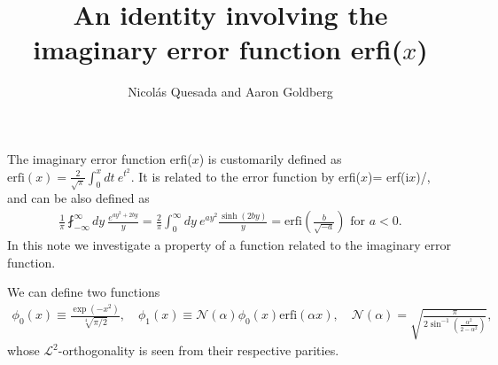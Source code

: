 \documentclass[english,12pt]{shreyasnotes}
\title{An identity involving the imaginary error function erfi($x$)}
\author{Nicol\'as Quesada and Aaron Goldberg}
\date{}
\newcommand{\eq}[1]{\begin{align}#1\end{align}}
\newcommand{\erfi}{\text{erfi}}
\newcommand{\iu}{\text{i}}
\begin{document}
\maketitle
\thispagestyle{empty}

The imaginary error function erfi($x$) is customarily defined as $\erfi(x) = \frac{2}{\sqrt{\pi}} \int_0^x dt \ e^{t^2}$.
It is related to the error function by erfi($x$)= erf($\iu x$)/\iu, and can be also defined as
\eq{
\frac{1}{\pi} \fint_{-\infty}^{\infty} dy\ \frac{e^{a y^2 +2 b y}}{ y} = \frac{2}{\pi}\int_0^\infty dy \ e^{a y^2}\frac{\sinh(2 b y)}{ y}=\erfi\left(\frac{b}{\sqrt{-a}}\right) \text{ for } a<0.
\label{eq:erfi-principal-integral}
}
In this note we investigate a property of a function related to the imaginary error function.

We can define two functions
\eq{
  \phi_0(x)\equiv\frac{\exp\left(-x^2\right)}{\sqrt[4]{\pi/2}}, 
\quad   \phi_1(x)\equiv%
\mathcal{N}\left(\alpha\right)\phi_0\left(x\right)\erfi\left(\alpha x\right),
\quad	\mathcal{N}\left(\alpha\right)=\sqrt{\frac{\pi}{2\sin^{-1}\left(\frac{\alpha^2}{2-\alpha^2}\right)}},
}
whose $\mathcal{L}^2$-orthogonality is seen from their respective parities. 
\end{document}
